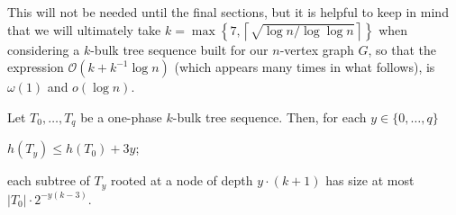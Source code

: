 \documentclass[10pt, conference, compsocconf]{IEEEtran}
\newcommand{\Oh}{\mathcal{O}}
\let\le\leqslant
\let\ge\geqslant
\newcommand{\itemref}[1]{(\ref{#1})}
\begin{document}
This will not be needed until the final sections, but it is helpful to keep in mind that we will ultimately take $k=\max\left\{7,\left\lceil\sqrt{\log n / \log\log n}\right\rceil\right\}$ when considering a $k$-bulk tree sequence built for our $n$-vertex graph $G$, so that the expression $\Oh(k+k^{-1}\log n)$ (which appears many times in what follows), is $\omega(1)$ and $o(\log n)$.

\begin{lem}
Let $T_0,\dots,T_{q}$ be a one-phase $k$-bulk tree sequence.
Then, for each $y\in\{0,\dots,q\}$
\begin{compactenum}[(i)]
\item $h(T_y)\le h(T_0) + 3y$;\label{lemma-item-B1}
\item each subtree of $T_y$ rooted at a node of depth $y\cdot (k+1)$ has size at most
$|T_0|\cdot2^{-y(k-3)}$.\label{lemma-item-B2}
\end{compactenum}
\end{lem}

\end{document}
